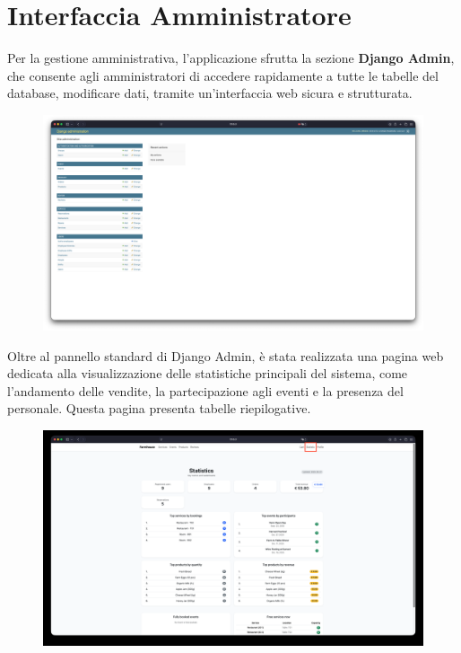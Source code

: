\documentclass[a4paper,12pt]{report}
\begin{document}
\newpage
\section{Interfaccia Amministratore}
Per la gestione amministrativa, l'applicazione sfrutta la sezione \textbf{Django Admin}, 
che consente agli amministratori di accedere rapidamente a tutte le tabelle del database, 
modificare dati, tramite un'interfaccia web sicura e strutturata.

\begin{figure}[H]
    \centering
    \includegraphics[width=\textwidth, trim=0 0 0 0]{./img/admin/djangoAdmin.png}
    \vspace{-1em}
    \label{fig:django-admin}
\end{figure}

Oltre al pannello standard di Django Admin, è stata realizzata una pagina web dedicata alla 
visualizzazione delle statistiche principali del sistema, come l'andamento delle vendite, la 
partecipazione agli eventi e la presenza del personale. Questa pagina presenta tabelle 
riepilogative.

\begin{figure}[H]
    \centering
    \includegraphics[width=\textwidth, trim=0 0 0 0]{./img/admin/statistic.png}
    \vspace{-1em}
    \label{fig:statistiche}
\end{figure}
\end{document}
